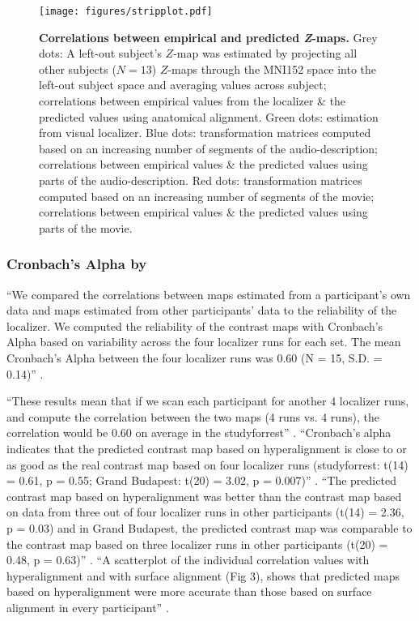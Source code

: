 \begin{figure*}[tbp] \centering
    \texttt{[image: figures/stripplot.pdf]} \caption{
    \textbf{Correlations between empirical and predicted
    \textit{\textbf{Z}}-maps.}
    Grey dots: A left-out subject's $Z$-map was estimated by projecting all
    other subjects ($N = 13$) $Z$-maps through the MNI152 space into the
    left-out subject space and averaging values across subject; correlations
    between empirical values from the localizer \& the predicted values using
    anatomical alignment.
    Green dots: estimation from visual localizer.
    Blue dots: transformation matrices computed based on an increasing number of
    segments of the audio-description; correlations between empirical values \&
    the predicted values using parts of the audio-description.
    Red dots: transformation matrices computed based on an increasing number of
    segments of the movie; correlations between empirical values \& the
    predicted values using parts of the movie.
}
\label{fig:stripplot}
\end{figure*}


\subsubsection{Cronbach's Alpha by \citet{jiahui2020predicting}}

%
``We compared the correlations between maps estimated from a participant's own
data and maps estimated from other participants' data to the reliability of the
localizer.
%
We computed the reliability of the contrast maps with Cronbach's Alpha based on
variability across the four localizer runs for each set.
%
The mean Cronbach's Alpha between the four localizer runs was 0.60 (N = 15, S.D.
= 0.14)'' \citet{jiahui2020predicting}.

%
``These results mean that if we scan each participant for another 4 localizer
runs, and compute the correlation between the two maps (4 runs vs. 4 runs), the
correlation would be 0.60 on average in the studyforrest''
\citet{jiahui2020predicting}.
%
``Cronbach's alpha indicates that the predicted contrast map based on
hyperalignment is close to or as good as the real contrast map based on four
localizer runs (studyforrest: t(14) = 0.61, p = 0.55; Grand Budapest: t(20) =
3.02, p = 0.007)'' \citet{jiahui2020predicting}.
%
``The predicted contrast map based on hyperalignment was better than the
contrast map based on data from three out of four localizer runs in other
participants (t(14) = 2.36, p = 0.03) and in Grand Budapest, the predicted
contrast map was comparable to the contrast map based on three localizer runs in
other participants (t(20) = 0.48, p = 0.63)''
\citet{jiahui2020predicting}.
%
``A scatterplot of the individual correlation values with hyperalignment and
with surface alignment (Fig 3), shows that predicted maps based on
hyperalignment were more accurate than those based on surface alignment in every
participant'' \citet{jiahui2020predicting}.


